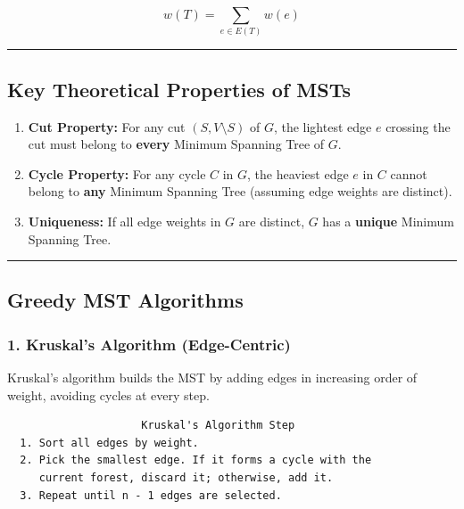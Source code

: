 \documentclass[
]{book}
\providecommand{\tightlist}{%
  \setlength{\itemsep}{0pt}\setlength{\parskip}{0pt}}
\theoremstyle{definition}
\theoremstyle{definition}
\theoremstyle{definition}
\theoremstyle{definition}
\theoremstyle{remark}
\begin{document}
\[w(T) = \sum_{e \in E(T)} w(e)\]

\begin{center}\rule{0.5\linewidth}{0.5pt}\end{center}

\subsection{Key Theoretical Properties of MSTs}\label{key-theoretical-properties-of-msts}

\begin{enumerate}
\def\labelenumi{\arabic{enumi}.}
\tightlist
\item
  \textbf{Cut Property:}
  For any cut \((S, V \setminus S)\) of \(G\), the lightest edge \(e\) crossing the cut must belong to \textbf{every} Minimum Spanning Tree of \(G\).
\item
  \textbf{Cycle Property:}
  For any cycle \(C\) in \(G\), the heaviest edge \(e\) in \(C\) cannot belong to \textbf{any} Minimum Spanning Tree (assuming edge weights are distinct).
\item
  \textbf{Uniqueness:}
  If all edge weights in \(G\) are distinct, \(G\) has a \textbf{unique} Minimum Spanning Tree.
\end{enumerate}

\begin{center}\rule{0.5\linewidth}{0.5pt}\end{center}

\subsection{Greedy MST Algorithms}\label{greedy-mst-algorithms}

\subsubsection{1. Kruskal's Algorithm (Edge-Centric)}\label{kruskals-algorithm-edge-centric}

Kruskal's algorithm builds the MST by adding edges in increasing order of weight, avoiding cycles at every step.

\begin{verbatim}
                     Kruskal's Algorithm Step
  1. Sort all edges by weight.
  2. Pick the smallest edge. If it forms a cycle with the 
     current forest, discard it; otherwise, add it.
  3. Repeat until n - 1 edges are selected.
\end{verbatim}
\end{document}
